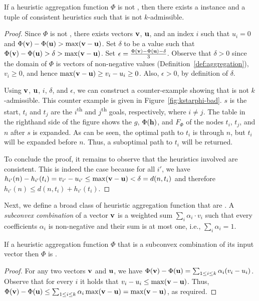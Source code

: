 \begin{theorem}
  \label{thm:consistent-dual}
  If a heuristic aggregation function $\Phi$ is not \axiomcons, then there exists a \kgs instance and a tuple of consistent heuristics such that \kastarphi is not $k$-admissible.
\end{theorem}
\begin{proof}
Since $\Phi$ is not \axiomcons, there exists vectors $\mathbf{v}$, $\mathbf{u}$, and an index $i$ such that $u_i = 0$ and $\Phi(\mathbf{v}) - \Phi(\mathbf{u}) > \max (\mathbf{v} - \mathbf{u})$. 
  Set $\delta$ to be a value such that $\Phi(\mathbf{v}) - \Phi(\mathbf{u}) > \delta > \max (\mathbf{v} - \mathbf{u})$. 
  Set $\epsilon = \frac{\Phi(\mathbf{v}) - \Phi(\mathbf{u}) - \delta}{3}$. Observe that $\delta>0$ since the domain of $\Phi$ is vectors of non-negative values (Definition~\ref{def:aggregation}), $v_i \geq 0$, and hence $\max (\mathbf{v} - \mathbf{u}) \geq v_i - u_i \geq 0$.
  Also, $\epsilon>0$, by definition of $\delta$. 
  	
  Using $\mathbf{v}$, $\mathbf{u}$, $i$, $\delta$, and $\epsilon$, we can construct a counter-example showing that \kastarphi is not $k$-admissible. 
  This counter example is given in Figure~\ref{fig:kstarphi-bad}. 
$s$ is the start, $t_i$ and $t_j$ are the $i$\textsuperscript{th} and $j$\textsuperscript{th} goals, respectively, where $i\neq j$.  
The table in the righthand side of the figure shows the $g$, $\Phi(\mathbf{h})$, and $F_\Phi$ of the nodes $t_i$, $t_j$, and $n$ after $s$ is expanded. As can be seen, the optimal path to $t_i$ is through $n$, but $t_i$ will be expanded before $n$. Thus, a suboptimal path to $t_i$ will be returned.  

  To conclude the proof, it remains to observe that the heuristics involved are consistent.
  This is indeed the case because for all $i'$, we have $h_{i'}(n) - h_{i'}(t_i) = v_{i'} - u_{i'} \leq \max (\mathbf{v} - \mathbf{u}) < \delta = d(n, t_i)$ and therefore $h_{i'}(n) \leq d(n, t_i) + h_{i'}(t_i)$.
\end{proof}
Next, we define a broad class of heuristic aggregation function that are \axiomcons. A \emph{subconvex combination} of a vector $\mathbf{v}$ is a weighted sum $\sum_i \alpha_i\cdot v_i$
such that every coefficients $\alpha_i$ is non-negative
and their sum is at most one, i.e., $\sum_i \alpha_i=1$. 


\begin{lemma}
	\label{thm:subconvex}
	If a heuristic aggregation function $\Phi$ that is a subconvex combination of its input vector
	then $\Phi$ is \axiomcons. 
\end{lemma}
\begin{proof}
	For any two vectors $\mathbf{v}$ and $\mathbf{u}$, we have $\Phi(\mathbf{v}) - \Phi(\mathbf{u}) = \sum_{1 \leq i \leq k} \alpha_i (v_i - u_i)$. Observe that for every $i$ it holds that $v_i - u_i \leq \max (\mathbf{v} - \mathbf{u})$. Thus, 
	$\Phi(\mathbf{v})-\Phi(\mathbf{u})\leq \sum_{1\leq i\leq k} \alpha_i \max (\mathbf{v} - \mathbf{u}) = \max (\mathbf{v} - \mathbf{u})$, as required. 
\end{proof}

